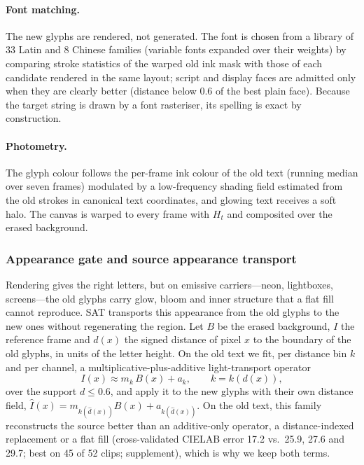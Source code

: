 \paragraph{Font matching.} The new glyphs are rendered, not generated. The font is chosen from a library of 33 Latin and 8 Chinese families (variable fonts expanded over their weights) by comparing stroke statistics of the warped old ink mask with those of each candidate rendered in the same layout; script and display faces are admitted only when they are clearly better (distance below 0.6 of the best plain face). Because the target string is drawn by a font rasteriser, its spelling is exact by construction.

\paragraph{Photometry.} The glyph colour follows the per-frame ink colour of the old text (running median over seven frames) modulated by a low-frequency shading field estimated from the old strokes in canonical text coordinates, and glowing text receives a soft halo. The canvas is warped to every frame with $H_t$ and composited over the erased background.

\subsubsection{Appearance gate and source appearance transport}
\label{sec:sat}
Rendering gives the right letters, but on emissive carriers---neon, lightboxes, screens---the old glyphs carry glow, bloom and inner structure that a flat fill cannot reproduce. SAT transports this appearance from the old glyphs to the new ones without regenerating the region. Let $B$ be the erased background, $I$ the reference frame and $d(x)$ the signed distance of pixel $x$ to the boundary of the old glyphs, in units of the letter height. On the old text we fit, per distance bin $k$ and per channel, a multiplicative-plus-additive light-transport operator
\begin{equation}
I(x)\approx m_k\,B(x)+a_k,\qquad k=k(d(x)),
\label{eq:sat}
\end{equation}
over the support $d\le0.6$, and apply it to the new glyphs with their own distance field, $\hat I(x)=m_{k(\hat d(x))}B(x)+a_{k(\hat d(x))}$. On the old text, this family reconstructs the source better than an additive-only operator, a distance-indexed replacement or a flat fill (cross-validated CIELAB error 17.2 vs.\ 25.9, 27.6 and 29.7; best on 45 of 52 clips; supplement), which is why we keep both terms.

